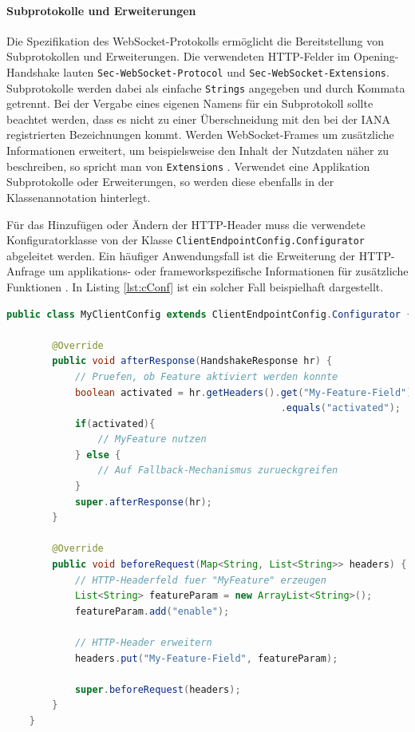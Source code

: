 \documentclass[11pt,a4paper,titlepage]{scrartcl}
\numberwithin{equation}{section}
\begin{document}
\begin{mdframed}[hidealllines=true,backgroundcolor=lightgray!20]
\paragraph{Subprotokolle und Erweiterungen}
Die Spezifikation des WebSocket-Protokolls ermöglicht die Bereitstellung von Subprotokollen und Erweiterungen. Die verwendeten HTTP-Felder im Opening-Handshake lauten \texttt{Sec-WebSocket-Protocol} und \texttt{Sec-WebSocket-Extensions}. Subprotokolle werden dabei als einfache \texttt{Strings} angegeben und durch Kommata getrennt. Bei der Vergabe eines eigenen Namens für ein Subprotokoll sollte beachtet werden, dass es nicht zu einer Überschneidung mit den bei der IANA registrierten Bezeichnungen kommt. Werden WebSocket-Frames um zusätzliche Informationen erweitert, um beispielsweise den Inhalt der Nutzdaten näher zu beschreiben, so spricht man von \texttt{Extensions} \autocite[102]{coward_java_2014}. Verwendet eine Applikation Subprotokolle oder Erweiterungen, so werden diese ebenfalls in der Klassenannotation hinterlegt.\\
\end{mdframed}
\noindent Für das Hinzufügen oder Ändern der HTTP-Header muss die verwendete Konfiguratorklasse von der Klasse \texttt{ClientEndpointConfig.Configurator} abgeleitet werden. Ein häufiger Anwendungsfall ist die Erweiterung der HTTP-Anfrage um applikations- oder frameworkspezifische Informationen für zusätzliche Funktionen \autocite[104]{coward_java_2014}. In Listing \ref{lst:cConf} ist ein solcher Fall beispielhaft dargestellt.\medskip

\begin{lstlisting}[frame=single, language=Java, caption=Java: ClientEndpointConfig Konfigurationsklasse, label=lst:cConf]
	public class MyClientConfig extends ClientEndpointConfig.Configurator {

		@Override
		public void afterResponse(HandshakeResponse hr) {
			// Pruefen, ob Feature aktiviert werden konnte
			boolean activated = hr.getHeaders().get("My-Feature-Field").get(0)
												.equals("activated");		
			if(activated){
				// MyFeature nutzen
			} else {
				// Auf Fallback-Mechanismus zurueckgreifen
			}
			super.afterResponse(hr);
		}

		@Override
		public void beforeRequest(Map<String, List<String>> headers) {
			// HTTP-Headerfeld fuer "MyFeature" erzeugen
			List<String> featureParam = new ArrayList<String>();
			featureParam.add("enable");
			
			// HTTP-Header erweitern
			headers.put("My-Feature-Field", featureParam);
			
			super.beforeRequest(headers);
		}
	}
\end{lstlisting}
\end{document}
